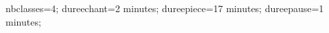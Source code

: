 \documentclass[exercice]{thedocument}%
\begin{document}
%
    \>nbclasses=4;%
    \>dureechant=2 minutes;%
    \>dureepiece=17 minutes;%
    \>dureepause=1 minutes;%
\end{document}
